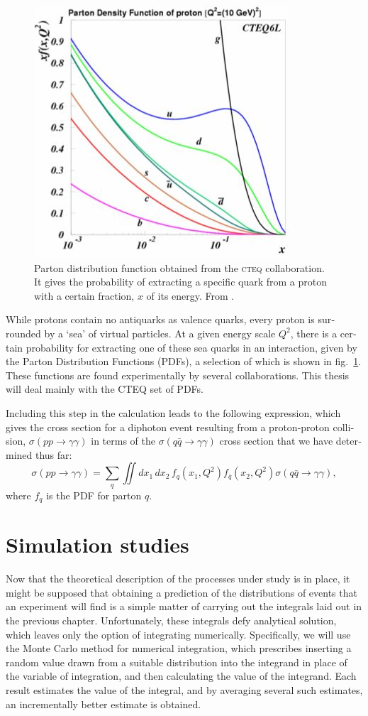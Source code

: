 \begin{english}
\begin{figure}[hbt]
\includegraphics[width=.55\textwidth]{pdf}\hfill\parbox[b]{.44\textwidth}{
\caption{Parton distribution function obtained from the \textsc{cteq} collaboration. It gives the probability of extracting a specific quark from a proton with a certain fraction, $x$ of its energy. From \cite{scien2}.\label{pdff}}}
\end{figure}

While protons contain no antiquarks as valence quarks, every proton is surrounded by a `sea' of virtual particles. At a given energy scale $Q^2$, there is a certain probability for extracting one of these sea quarks in an interaction, given by the Parton Distribution Functions (PDFs), a selection of which is shown in fig.~\ref{pdff}. These functions are found experimentally by several collaborations. This thesis will deal mainly with the CTEQ set of PDFs.

Including this step in the calculation leads to the following expression, which gives the cross section for a diphoton event resulting from a proton-proton collision, $\sigma(pp\rightarrow\gamma\gamma)$ in terms of the $\sigma(q\bar q \rightarrow \gamma\gamma)$ cross section that we have determined thus far:
\[\sigma(pp\rightarrow\gamma\gamma)=\sum_q\iint dx_1\,dx_2\,f_q(x_1,Q^2)f_{\bar q}(x_2,Q^2)\sigma(q\bar q\rightarrow\gamma\gamma),\label{pdf}\]
where $f_q$ is the PDF for parton $q$.


\chapter{Simulation studies}\label{ch.mc}

Now that the theoretical description of the processes under study is in place, it might be supposed that obtaining a prediction of the distributions of events that an experiment will find is a simple matter of carrying out the integrals laid out in the previous chapter. Unfortunately, these integrals defy analytical solution, which leaves only the option of integrating numerically. Specifically, we will use the Monte Carlo method for numerical integration, which prescribes inserting a random value drawn from a suitable distribution into the integrand in place of the variable of integration, and then calculating the value of the integrand. Each result estimates the value of the integral, and by averaging several such estimates, an incrementally better estimate is obtained.


\end{english}
